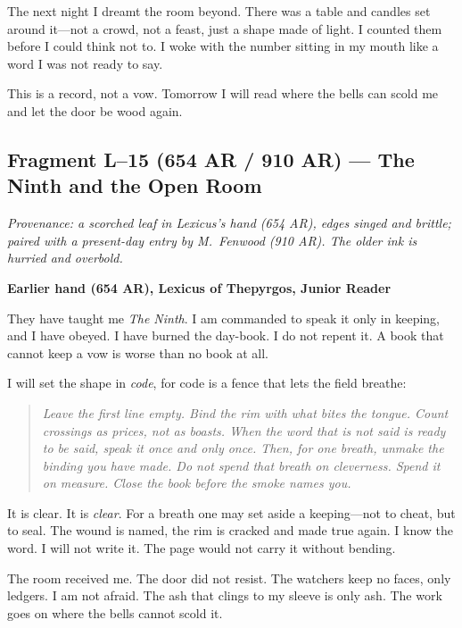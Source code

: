 \documentclass[11pt]{article}
\begin{document}
The next night I dreamt the room beyond. There was a table and candles set around it—not a crowd, not a feast, just a shape made of light. I counted them before I could think not to. I woke with the number sitting in my mouth like a word I was not ready to say.

This is a record, not a vow. Tomorrow I will read where the bells can scold me and let the door be wood again.

\subsection{Fragment L--15 (654 AR / 910 AR) --- The Ninth and the Open Room}
\label{frag:l15}
{}

\noindent\textit{Provenance: a scorched leaf in Lexicus’s hand (654 AR), edges singed and brittle; paired with a present-day entry by M.\ Fenwood (910 AR). The older ink is hurried and overbold.}

\medskip
\noindent\textbf{Earlier hand (654 AR), Lexicus of Thepyrgos, Junior Reader}

They have taught me \emph{The Ninth}. I am commanded to speak it only in keeping, and I have obeyed. I have burned the day-book. I do not repent it. A book that cannot keep a vow is worse than no book at all.

I will set the shape in \emph{code}, for code is a fence that lets the field breathe:

\begin{quote}\small
\textit{Leave the first line empty. Bind the rim with what bites the tongue. Count crossings as prices, not as boasts. When the word that is not said is ready to be said, speak it once and only once. Then, for one breath, unmake the binding you have made. Do not spend that breath on cleverness. Spend it on measure. Close the book before the smoke names you.}
\end{quote}

It is clear. It is \emph{clear}. For a breath one may set aside a keeping—not to cheat, but to seal. The wound is named, the rim is cracked and made true again. I know the word. I will not write it. The page would not carry it without bending.

The room received me. The door did not resist. The watchers keep no faces, only ledgers. I am not afraid. The ash that clings to my sleeve is only ash. The work goes on where the bells cannot scold it.
\end{document}
